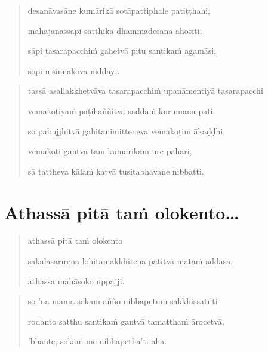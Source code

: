 \documentclass[11pt,oneside]{memoir}
\begin{document}

\clearpage

\begin{quote}
desanāvasāne kumārikā sotāpattiphale patiṭṭhahi,

mahājanassāpi sātthikā dhammadesanā ahosīti.

sāpi tasarapacchiṁ gahetvā pitu santikaṁ agamāsi,

sopi nisinnakova niddāyi.
\end{quote}


\clearpage

\begin{quote}
tassā asallakkhetvāva tasarapacchiṁ upanāmentiyā tasarapacchi

vemakoṭiyaṁ paṭihaññitvā saddaṁ kurumānā pati.

so pabujjhitvā gahitanimitteneva vemakoṭiṁ ākaḍḍhi.

vemakoṭi gantvā taṁ kumārikaṁ ure pahari,

sā tattheva kālaṁ katvā tusitabhavane nibbatti.
\end{quote}


\clearpage

\section{Athassā pitā taṁ olokento\ldots{}}
\label{sec:org09fba25}

\begin{quote}
athassā pitā taṁ olokento

sakalasarīrena lohitamakkhitena patitvā mataṁ addasa.

athassa mahāsoko uppajji.
\end{quote}



\clearpage

\begin{quote}
so 'na mama sokaṁ añño nibbāpetuṁ sakkhissatī'ti

rodanto satthu santikaṁ gantvā tamatthaṁ ārocetvā,

'bhante, sokaṁ me nibbāpethā'ti āha.
\end{quote}

\end{document}
